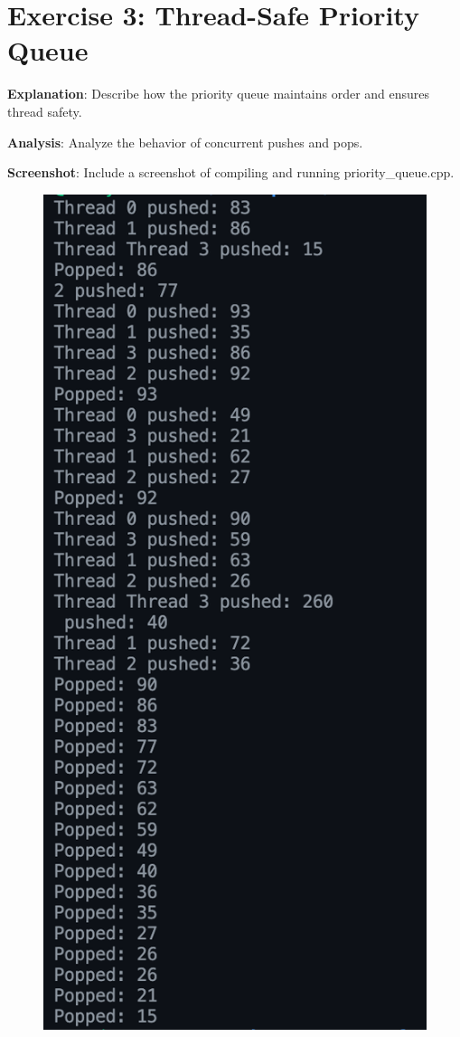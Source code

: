 \documentclass[a4paper,11pt]{article}
\begin{document}
\section{Exercise 3: Thread-Safe Priority Queue}

\textbf{Explanation}: Describe how the priority queue maintains order and ensures thread safety.

\textbf{Analysis}: Analyze the behavior of concurrent pushes and pops.

\textbf{Screenshot}: Include a screenshot of compiling and running priority_queue.cpp.
\begin{figure}[H]
    \centering
    \includegraphics[width=\textwidth]{priorityQueue.png}

\end{figure}
\end{document}
